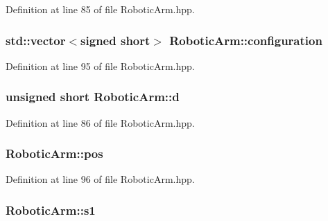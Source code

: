 Definition at line 85 of file Robotic\+Arm.\+hpp.

\subsubsection[{\texorpdfstring{configuration}{configuration}}]{\setlength{\rightskip}{0pt plus 5cm}std\+::vector$<$signed short$>$ Robotic\+Arm\+::configuration\hspace{0.3cm}{\ttfamily [private]}}\hypertarget{class_robotic_arm_af618e34115514462d09020049c7e8ee9}{}\label{class_robotic_arm_af618e34115514462d09020049c7e8ee9}


Definition at line 95 of file Robotic\+Arm.\+hpp.

\subsubsection[{\texorpdfstring{d}{d}}]{\setlength{\rightskip}{0pt plus 5cm}unsigned short Robotic\+Arm\+::d}\hypertarget{class_robotic_arm_ada1f488e8627fcb18d4b15b70c593be8}{}\label{class_robotic_arm_ada1f488e8627fcb18d4b15b70c593be8}


Definition at line 86 of file Robotic\+Arm.\+hpp.

\subsubsection[{\texorpdfstring{pos}{pos}}]{ Robotic\+Arm\+::pos\hspace{0.3cm}{\ttfamily [private]}}\hypertarget{class_robotic_arm_a8f6a5bea331874cfae234e6b97f6dec5}{}\label{class_robotic_arm_a8f6a5bea331874cfae234e6b97f6dec5}


Definition at line 96 of file Robotic\+Arm.\+hpp.

\subsubsection[{\texorpdfstring{s1}{s1}}]{ Robotic\+Arm\+::s1}\hypertarget{class_robotic_arm_a405680ac32df6d444683b997b785623f}{}\label{class_robotic_arm_a405680ac32df6d444683b997b785623f}


